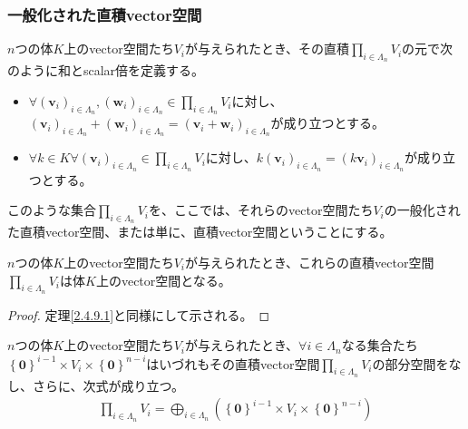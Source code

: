 \documentclass[dvipdfmx]{jsarticle}
\begin{document}
\subsubsection{一般化された直積vector空間}%
\begin{dfn}
$n$つの体$K$上のvector空間たち$V_{i}$が与えられたとき、その直積$\prod_{i \in \varLambda_{n}} V_{i}$の元で次のように和とscalar倍を定義する。
\begin{itemize}
\item
  $\forall\left( \mathbf{v}_{i} \right)_{i \in \varLambda_{n}},\left( \mathbf{w}_{i} \right)_{i \in \varLambda_{n}} \in \prod_{i \in \varLambda_{n}} V_{i}$に対し、$\left( \mathbf{v}_{i} \right)_{i \in \varLambda_{n}} + \left( \mathbf{w}_{i} \right)_{i \in \varLambda_{n}} = \left( \mathbf{v}_{i} + \mathbf{w}_{i} \right)_{i \in \varLambda_{n}}$が成り立つとする。
\item
  $\forall k \in K\forall\left( \mathbf{v}_{i} \right)_{i \in \varLambda_{n}} \in \prod_{i \in \varLambda_{n}} V_{i}$に対し、$k\left( \mathbf{v}_{i} \right)_{i \in \varLambda_{n}} = \left( k\mathbf{v}_{i} \right)_{i \in \varLambda_{n}}$が成り立つとする。
\end{itemize}
このような集合$\prod_{i \in \varLambda_{n}} V_{i}$を、ここでは、それらのvector空間たち$V_{i}$の一般化された直積vector空間、または単に、直積vector空間ということにする。
\end{dfn}
\begin{thm}\label{2.4.9.10}
$n$つの体$K$上のvector空間たち$V_{i}$が与えられたとき、これらの直積vector空間$\prod_{i \in \varLambda_{n}} V_{i}$は体$K$上のvector空間となる。
\end{thm}
\begin{proof} 定理\ref{2.4.9.1}と同様にして示される。
\end{proof}
\begin{thm}\label{2.4.9.11}
$n$つの体$K$上のvector空間たち$V_{i}$が与えられたとき、$\forall i \in \varLambda_{n}$なる集合たち$\left\{ \mathbf{0} \right\}^{i - 1} \times V_{i} \times \left\{ \mathbf{0} \right\}^{n - i}$はいづれもその直積vector空間$\prod_{i \in \varLambda_{n}} V_{i}$の部分空間をなし、さらに、次式が成り立つ。
\begin{align*}
\prod_{i \in \varLambda_{n}} V_{i} = \bigoplus_{i \in \varLambda_{n}} \left( \left\{ \mathbf{0} \right\}^{i - 1} \times V_{i} \times \left\{ \mathbf{0} \right\}^{n - i} \right)
\end{align*}
\end{thm}
\end{document}
